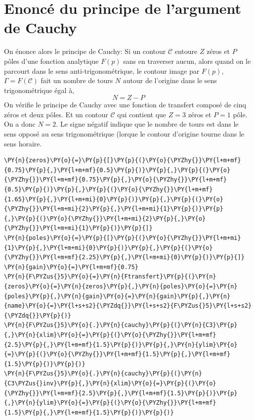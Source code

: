\section{Enoncé du principe de l'argument de Cauchy}
On énonce alors le principe de Cauchy:
Si un contour \(\mathcal{C}\) entoure \(Z\) zéros et \(P\) pôles d'une
fonction analytique \(F(p)\) sans en traverser aucun, alors quand on le
parcourt dans le sens anti-trigonométrique, le contour image par
\(F(p)\), \(\Gamma=F(\mathcal{C})\) fait un nombre de tours \(N\) autour
de l'origine dans le sens trigonométrique égal à,
\[
    N=Z-P
\]
On vérifie le principe de Cauchy avec une fonction de transfert composé
de cinq zéros et deux pôles. Et un contour \(\mathcal{C}\) qui contient 
que \(Z=3\) zéros et \(P=1\) pôle. On a donc \(N=2\). Le signe négatif
indique que le nombre de tours est dans le sens opposé au sens
trigonométrique (lorque le contour d'origine tourne dans le sens
horaire.
\begin{tcolorbox}[breakable, size=fbox, boxrule=1pt, pad at break*=1mm,colback=cellbackground, colframe=cellborder]
\begin{Verbatim}[commandchars=\\\{\}]
\PY{n}{zeros}\PY{o}{=}\PY{p}{[}\PY{p}{(}\PY{o}{\PYZhy{}}\PY{l+m+mf}{0.75}\PY{p}{,}\PY{l+m+mf}{0.5}\PY{p}{)}\PY{p}{,}\PY{p}{(}\PY{o}{\PYZhy{}}\PY{l+m+mf}{0.75}\PY{p}{,}\PY{o}{\PYZhy{}}\PY{l+m+mf}{0.5}\PY{p}{)}\PY{p}{,}\PY{p}{(}\PY{o}{\PYZhy{}}\PY{l+m+mf}{1.65}\PY{p}{,}\PY{l+m+mi}{0}\PY{p}{)}\PY{p}{,}\PY{p}{(}\PY{o}{\PYZhy{}}\PY{l+m+mi}{2}\PY{p}{,}\PY{l+m+mi}{1}\PY{p}{)}\PY{p}{,}\PY{p}{(}\PY{o}{\PYZhy{}}\PY{l+m+mi}{2}\PY{p}{,}\PY{o}{\PYZhy{}}\PY{l+m+mi}{1}\PY{p}{)}\PY{p}{]}
\PY{n}{poles}\PY{o}{=}\PY{p}{[}\PY{p}{(}\PY{o}{\PYZhy{}}\PY{l+m+mi}{1}\PY{p}{,}\PY{l+m+mi}{0}\PY{p}{)}\PY{p}{,}\PY{p}{(}\PY{o}{\PYZhy{}}\PY{l+m+mf}{2.25}\PY{p}{,}\PY{l+m+mi}{0}\PY{p}{)}\PY{p}{]}
\PY{n}{gain}\PY{o}{=}\PY{l+m+mf}{0.75}
\PY{n}{F\PYZus{}5}\PY{o}{=}\PY{n}{Ftransfert}\PY{p}{(}\PY{n}{zeros}\PY{o}{=}\PY{n}{zeros}\PY{p}{,}\PY{n}{poles}\PY{o}{=}\PY{n}{poles}\PY{p}{,}\PY{n}{gain}\PY{o}{=}\PY{n}{gain}\PY{p}{,}\PY{n}{name}\PY{o}{=}\PY{l+s+s2}{\PYZdq{}}\PY{l+s+s2}{F\PYZus{}5}\PY{l+s+s2}{\PYZdq{}}\PY{p}{)}
\PY{n}{F\PYZus{}5}\PY{o}{.}\PY{n}{cauchy}\PY{p}{(}\PY{n}{C3}\PY{p}{,}\PY{n}{xlim}\PY{o}{=}\PY{p}{(}\PY{o}{\PYZhy{}}\PY{l+m+mf}{2.5}\PY{p}{,}\PY{l+m+mf}{1.5}\PY{p}{)}\PY{p}{,}\PY{n}{ylim}\PY{o}{=}\PY{p}{(}\PY{o}{\PYZhy{}}\PY{l+m+mf}{1.5}\PY{p}{,}\PY{l+m+mf}{1.5}\PY{p}{)}\PY{p}{)}
\PY{n}{F\PYZus{}5}\PY{o}{.}\PY{n}{cauchy}\PY{p}{(}\PY{n}{C3\PYZus{}inv}\PY{p}{,}\PY{n}{xlim}\PY{o}{=}\PY{p}{(}\PY{o}{\PYZhy{}}\PY{l+m+mf}{2.5}\PY{p}{,}\PY{l+m+mf}{1.5}\PY{p}{)}\PY{p}{,}\PY{n}{ylim}\PY{o}{=}\PY{p}{(}\PY{o}{\PYZhy{}}\PY{l+m+mf}{1.5}\PY{p}{,}\PY{l+m+mf}{1.5}\PY{p}{)}\PY{p}{)}
\end{Verbatim}
\end{tcolorbox}
